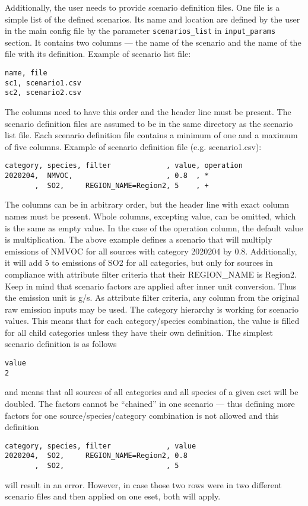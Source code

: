 \documentclass[a4paper,11pt]{article}
\begin{document}
Additionally, the user needs to provide scenario definition files. One file is a simple list of the defined scenarios. Its name and location are defined by the user in the main config file by the parameter \verb|scenarios_list| in \verb|input_params| section. It contains two columns --- the name of the scenario and the name of the file with its definition. Example of scenario list file:
\begin{verbatim}
name, file
sc1, scenario1.csv
sc2, scenario2.csv
\end{verbatim}
The columns need to have this order and the header line must be present. The scenario definition files are assumed to be in the same directory as the scenario list file. Each scenario definition file contains a minimum of one and a maximum of five columns. Example of scenario definition file (e.g. scenario1.csv):
\begin{verbatim}
category, species, filter             , value, operation
2020204,  NMVOC,                      , 0.8  , *
       ,  SO2,     REGION_NAME=Region2, 5    , +
\end{verbatim}
The columns can be in arbitrary order, but the header line with exact column names must be present. Whole columns, excepting value, can be omitted, which is the same as empty value. In the case of the operation column, the default value is multiplication. The above example defines a scenario that will multiply emissions of NMVOC for all sources with category 2020204 by 0.8. Additionally, it will add 5 to emissions of SO2 for all categories, but only for sources in compliance with attribute filter criteria that their REGION\_NAME is Region2. Keep in mind that scenario factors are applied after inner unit conversion. Thus the emission unit is g/s. As attribute filter criteria, any column from the original raw emission inputs may be used. The category hierarchy is working for scenario values. This means that for each category/species combination, the value is filled for all child categories unless they have their own definition. The simplest scenario definition is as follows
\begin{verbatim}
value
2
\end{verbatim}
and means that all sources of all categories and all species of a given eset will be doubled. The factors cannot be ``chained'' in one scenario --- thus defining more factors for one source/species/category combination is not allowed and this definition
\begin{verbatim}
category, species, filter             , value
2020204,  SO2,     REGION_NAME=Region2, 0.8
       ,  SO2,                        , 5
\end{verbatim}
will result in an error. However, in case those two rows were in two different scenario files and then applied on one eset, both will apply.
\end{document}
